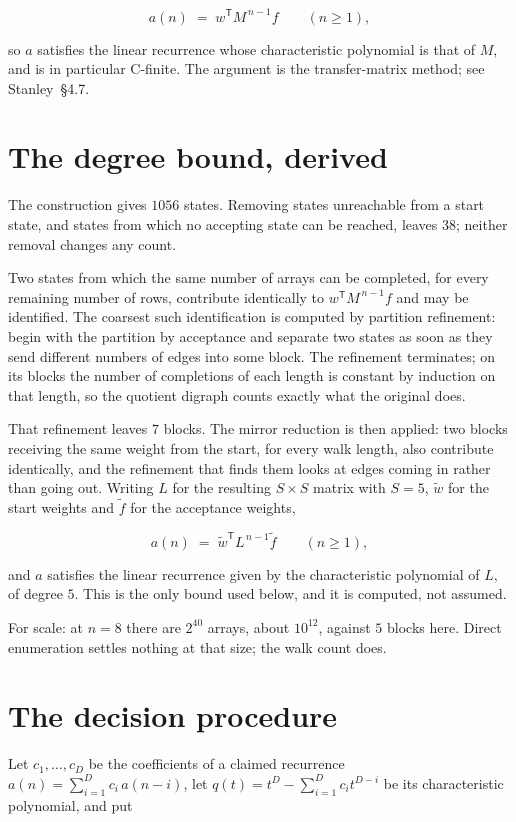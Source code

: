 \documentclass[11pt]{article}
\theoremstyle{definition}
\begin{document}
\[a(n) \;=\; w^{\mathsf T} M^{\,n-1} f \qquad (n \ge 1),\]

so $a$ satisfies the linear recurrence whose characteristic polynomial is that of $M$, and is in particular C-finite. The argument is the transfer-matrix method; see Stanley~\S4.7.

\section{The degree bound, derived}

The construction gives $1056$ states. Removing states unreachable from a start state, and states from which no accepting state can be reached, leaves $38$; neither removal changes any count.

Two states from which the same number of arrays can be completed, for every remaining number of rows, contribute identically to $w^{\mathsf T}M^{\,n-1}f$ and may be identified. The coarsest such identification is computed by partition refinement: begin with the partition by acceptance and separate two states as soon as they send different numbers of edges into some block. The refinement terminates; on its blocks the number of completions of each length is constant by induction on that length, so the quotient digraph counts exactly what the original does.

That refinement leaves $7$ blocks. The mirror reduction is then applied: two blocks receiving the same weight from the start, for every walk length, also contribute identically, and the refinement that finds them looks at edges coming in rather than going out. Writing $L$ for the resulting $S \times S$ matrix with $S = 5$, $\tilde w$ for the start weights and $\tilde f$ for the acceptance weights,

\[a(n) \;=\; \tilde w^{\mathsf T} L^{\,n-1} \tilde f \qquad (n \ge 1),\]

and $a$ satisfies the linear recurrence given by the characteristic polynomial of $L$, of degree $5$. This is the only bound used below, and it is computed, not assumed.

For scale: at $n = 8$ there are $2^{40}$ arrays, about $10^{12}$, against $5$ blocks here. Direct enumeration settles nothing at that size; the walk count does.

\section{The decision procedure}

Let $c_1,\dots,c_D$ be the coefficients of a claimed recurrence $a(n) = \sum_{i=1}^{D} c_i\,a(n-i)$, let $q(t) = t^{D} - \sum_{i=1}^{D} c_i t^{D-i}$ be its characteristic polynomial, and put
\end{document}
